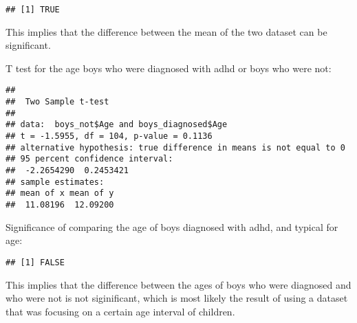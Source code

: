 \documentclass[]{article}
\newenvironment{Shaded}{\begin{snugshade}}{\end{snugshade}}
\newcommand{\DataTypeTok}[1]{\textcolor[rgb]{0.13,0.29,0.53}{#1}}
\newcommand{\FloatTok}[1]{\textcolor[rgb]{0.00,0.00,0.81}{#1}}
\newcommand{\KeywordTok}[1]{\textcolor[rgb]{0.13,0.29,0.53}{\textbf{#1}}}
\newcommand{\NormalTok}[1]{#1}
\newcommand{\OperatorTok}[1]{\textcolor[rgb]{0.81,0.36,0.00}{\textbf{#1}}}
\newcommand{\OtherTok}[1]{\textcolor[rgb]{0.56,0.35,0.01}{#1}}
\newcommand{\StringTok}[1]{\textcolor[rgb]{0.31,0.60,0.02}{#1}}
\begin{document}
\begin{Shaded}
\end{Shaded}

\begin{verbatim}
## [1] TRUE
\end{verbatim}

This implies that the difference between the mean of the two dataset can
be significant.

T test for the age boys who were diagnosed with adhd or boys who were
not:

\begin{Shaded}
\end{Shaded}

\begin{verbatim}
## 
##  Two Sample t-test
## 
## data:  boys_not$Age and boys_diagnosed$Age
## t = -1.5955, df = 104, p-value = 0.1136
## alternative hypothesis: true difference in means is not equal to 0
## 95 percent confidence interval:
##  -2.2654290  0.2453421
## sample estimates:
## mean of x mean of y 
##  11.08196  12.09200
\end{verbatim}

Significance of comparing the age of boys diagnosed with adhd, and
typical for age:

\begin{Shaded}
\end{Shaded}

\begin{verbatim}
## [1] FALSE
\end{verbatim}

This implies that the difference between the ages of boys who were
diagnosed and who were not is not siginificant, which is most likely the
result of using a dataset that was focusing on a certain age interval of
children.
\end{document}
